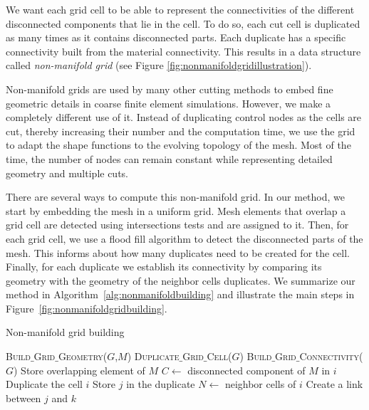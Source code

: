 \documentclass[11pt, oneside, a4paper]{memoir}
\begin{document}
We want each grid cell to be able to represent  the connectivities of the different disconnected components that lie in the cell. To do so, each cut cell is duplicated as many times as it contains disconnected parts. Each duplicate has a specific connectivity built from the material connectivity. This results in a data structure called \emph{non-manifold grid} (see Figure \ref{fig:nonmanifoldgridillustration}).

Non-manifold grids are used by many other cutting methods to embed fine geometric details in coarse finite element simulations. However, we make a completely different use of it. Instead of duplicating control nodes as the cells are cut, thereby increasing their number and the computation time, we use the grid to adapt the shape functions to the evolving topology of the mesh. Most of the time, the number of nodes can remain constant while representing detailed geometry and multiple cuts.

There are several ways to compute this non-manifold grid. In our method, we start by embedding the mesh in a uniform grid. Mesh elements that overlap a grid cell are detected using intersections tests and are assigned to it. Then, for each grid cell, we use a flood fill algorithm to detect the disconnected parts of the mesh. This informs about how many duplicates need to be created for the cell. Finally, for each duplicate we establish its connectivity by comparing its geometry with the geometry of the neighbor cells duplicates. We summarize our method in Algorithm~\ref{alg:nonmanifoldbuilding} and illustrate the main steps in Figure~\ref{fig:nonmanifoldgridbuilding}.

\begin{algorithm}[!ht]
\caption{\label{alg:nonmanifoldbuilding}Non-manifold grid building}
\begin{algorithmic}[1]
\State \textsc{Build$\_$Grid$\_$Geometry}($G$,$M$)
\State \textsc{Duplicate$\_$Grid$\_$Cell}($G$)
\State \textsc{Build$\_$Grid$\_$Connectivity}($G$)
\EndProcedure
\State
{}
\State Store overlapping element of $M$
\EndFor
\EndProcedure
\State
{}
\State $C \gets $ disconnected component of $M$ in $i$
	\State Duplicate the cell $i$
	\State Store $j$ in the duplicate
\EndFor
\EndFor
\EndProcedure
\State
{}
\State $N \gets $ neighbor cells of $i$
\State Create a link between $j$ and $k$ 
\EndIf
\EndFor
\EndFor
\EndFor
\EndProcedure
\end{algorithmic}
\end{algorithm}
\end{document}
